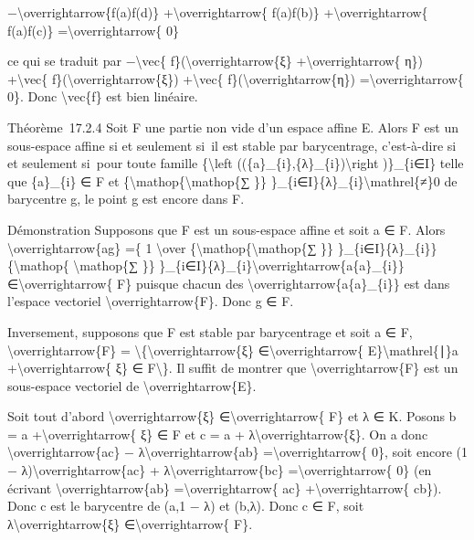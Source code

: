 \documentclass[]{article}
\begin{document}
−\textbackslash{}overrightarrow\{f(a)f(d)\}
+\textbackslash{}overrightarrow\{ f(a)f(b)\}
+\textbackslash{}overrightarrow\{ f(a)f(c)\}
=\textbackslash{}overrightarrow\{ 0\}

ce qui se traduit par −\textbackslash{}vec\{
f\}(\textbackslash{}overrightarrow\{ξ\}
+\textbackslash{}overrightarrow\{ η\}) +\textbackslash{}vec\{
f\}(\textbackslash{}overrightarrow\{ξ\}) +\textbackslash{}vec\{
f\}(\textbackslash{}overrightarrow\{η\})
=\textbackslash{}overrightarrow\{ 0\}. Donc \textbackslash{}vec\{f\} est
bien linéaire.

Théorème~17.2.4 Soit F une partie non vide d'un espace affine E. Alors F
est un sous-espace affine si et seulement si~il est stable par
barycentrage, c'est-à-dire si et seulement si~pour toute famille
\{\textbackslash{}left ((\{a\}\_\{i\},\{λ\}\_\{i\})\textbackslash{}right
)\}\_\{i∈I\} telle que \{a\}\_\{i\} ∈ F et
\{\textbackslash{}mathop\{\textbackslash{}mathop\{∑ \}\}
\}\_\{i∈I\}\{λ\}\_\{i\}\textbackslash{}mathrel\{≠\}0 de barycentre g, le
point g est encore dans F.

Démonstration Supposons que F est un sous-espace affine et soit a ∈ F.
Alors \textbackslash{}overrightarrow\{ag\} =\{ 1 \textbackslash{}over
\{\textbackslash{}mathop\{\textbackslash{}mathop\{∑ \}\}
\}\_\{i∈I\}\{λ\}\_\{i\}\} \{\textbackslash{}mathop\{
\textbackslash{}mathop\{∑ \}\}
\}\_\{i∈I\}\{λ\}\_\{i\}\textbackslash{}overrightarrow\{a\{a\}\_\{i\}\}
∈\textbackslash{}overrightarrow\{ F\} puisque chacun des
\textbackslash{}overrightarrow\{a\{a\}\_\{i\}\} est dans l'espace
vectoriel \textbackslash{}overrightarrow\{F\}. Donc g ∈ F.

Inversement, supposons que F est stable par barycentrage et soit a ∈ F,
\textbackslash{}overrightarrow\{F\} =
\textbackslash{}\{\textbackslash{}overrightarrow\{ξ\}
∈\textbackslash{}overrightarrow\{ E\}\textbackslash{}mathrel\{∣\}a
+\textbackslash{}overrightarrow\{ ξ\} ∈ F\textbackslash{}\}. Il suffit
de montrer que \textbackslash{}overrightarrow\{F\} est un sous-espace
vectoriel de \textbackslash{}overrightarrow\{E\}.

Soit tout d'abord \textbackslash{}overrightarrow\{ξ\}
∈\textbackslash{}overrightarrow\{ F\} et λ ∈ K. Posons b = a
+\textbackslash{}overrightarrow\{ ξ\} ∈ F et c = a +
λ\textbackslash{}overrightarrow\{ξ\}. On a donc
\textbackslash{}overrightarrow\{ac\} −
λ\textbackslash{}overrightarrow\{ab\} =\textbackslash{}overrightarrow\{
0\}, soit encore (1 − λ)\textbackslash{}overrightarrow\{ac\} +
λ\textbackslash{}overrightarrow\{bc\} =\textbackslash{}overrightarrow\{
0\} (en écrivant \textbackslash{}overrightarrow\{ab\}
=\textbackslash{}overrightarrow\{ ac\} +\textbackslash{}overrightarrow\{
cb\}). Donc c est le barycentre de (a,1 − λ) et (b,λ). Donc c ∈ F, soit
λ\textbackslash{}overrightarrow\{ξ\} ∈\textbackslash{}overrightarrow\{
F\}.
\end{document}
